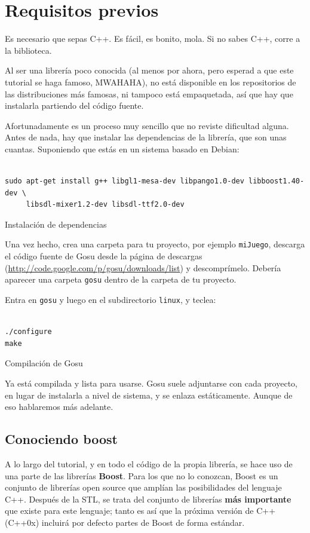 \documentclass{article}
\begin{document}
\section{Requisitos previos}
Es necesario que sepas C++. Es fácil, es bonito, mola. Si no sabes
C++, corre a la biblioteca.

Al ser una librería poco conocida (al menos por ahora, pero esperad a
que este tutorial se haga famoso, MWAHAHA), no está disponible en los
repositorios de las distribuciones más famosas, ni tampoco está
empaquetada, así que hay que instalarla partiendo del código fuente.

Afortunadamente es un proceso muy sencillo que no reviste dificultad
alguna. Antes de nada, hay que instalar las dependencias de la
librería, que son unas cuantas. Suponiendo que estás en un sistema
basado en Debian:

\begin{code}
  \begin{Verbatim}

sudo apt-get install g++ libgl1-mesa-dev libpango1.0-dev libboost1.40-dev \
     libsdl-mixer1.2-dev libsdl-ttf2.0-dev
  \end{Verbatim}
  \caption{Instalación de dependencias}
\end{code}
Una vez hecho, crea una carpeta para tu proyecto, por ejemplo
\texttt{miJuego}, descarga el código fuente de Gosu desde la página de
descargas (\url{http://code.google.com/p/gosu/downloads/list}) y
descomprímelo. Debería aparecer una carpeta \texttt{gosu} dentro de la
carpeta de tu proyecto.

Entra en \texttt{gosu} y luego en el subdirectorio \texttt{linux}, y
teclea:
\begin{code}
\begin{verbatim}

./configure
make
\end{verbatim}
\caption{Compilación de Gosu}
\end{code}

Ya está compilada y lista para usarse. Gosu suele adjuntarse con cada
proyecto, en lugar de instalarla a nivel de sistema, y se enlaza
estáticamente. Aunque de eso hablaremos más adelante.

\subsection{Conociendo boost}
A lo largo del tutorial, y en todo el código de la propia librería, se
hace uso de una parte de las librerías \textbf{Boost}. Para los que no
lo conozcan, Boost es un conjunto de librerías open source que amplían
las posibilidades del lenguaje C++. Después de la STL, se trata del
conjunto de librerías \textbf{más importante} que existe para este
lenguaje; tanto es así que la próxima versión de C++ (C++0x) incluirá
por defecto partes de Boost de forma estándar.
\end{document}
